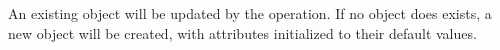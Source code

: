 \item An existing object will be updated by the operation.  If no object does
    exists, a new object will be created, with attributes initialized to their
    default values.
